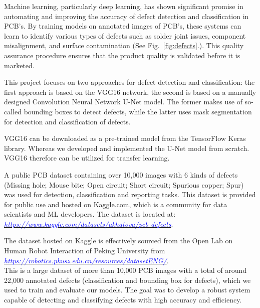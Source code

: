 \documentclass[12pt]{article}
\begin{document}
Machine learning, particularly deep learning, has shown significant promise in automating and improving the accuracy of defect detection and classification in PCB's. By training models on annotated images of PCB's, these systems can learn to identify various types of defects such as solder joint issues, component misalignment, and surface contamination (See Fig.~\ref{fig:defects}.). This quality assurance procedure ensures that the product quality is validated before it is marketed.

This project focuses on two approaches for defect detection and classification: the first approach is based on the VGG16 network, the second is based on a manually designed Convolution Neural Network U-Net model. The former makes use of so-called bounding boxes to detect defects, while the latter uses mask segmentation for detection and classification of defects.

VGG16 can be downloaded as a pre-trained model from the TensorFlow Keras library. Whereas we developed and implemented the U-Net model from scratch. VGG16 therefore can be utilized for transfer learning.

A public PCB dataset containing over 10,000 images with 6 kinds of defects (Missing hole; Mouse bite; Open circuit; Short circuit; Spurious copper; Spur) was used for detection, classification and reporting tasks. This dataset is provided for public use and hosted on Kaggle.com, which is a community for data scientists and ML developers. The dataset is located at:\\ {\href{https://www.kaggle.com/datasets/akhatova/pcb-defects}{\textit{\textcolor{blue}{https://www.kaggle.com/datasets/akhatova/pcb-defects}}}}.

The dataset hosted on Kaggle is effectively sourced from the Open Lab on Human Robot Interaction of Peking University from\\
\href{https://robotics.pkusz.edu.cn/resources/datasetENG/}{\textit{\textcolor{blue}{https://robotics.pkusz.edu.cn/resources/datasetENG/}}}.\\
This is a large dataset of more than 10,000 PCB images with a total of around 22,000 annotated defects (classification and bounding box for defects), which we used to train and evaluate our models. The goal was to develop a robust system capable of detecting and classifying defects with high accuracy and efficiency.
\end{document}
